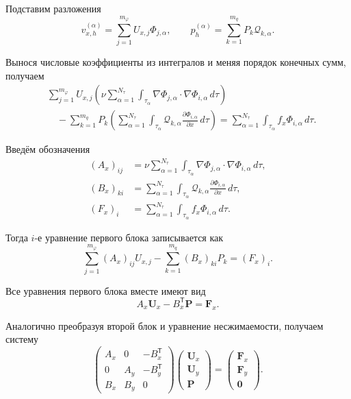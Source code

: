 \documentclass[a4paper,14pt]{extarticle}
\begin{document}
	Подставим разложения
	\[
	v_{x,h}^{(\alpha)}
	=
	\sum_{j=1}^{m_\varphi}
	U_{x,j}\Phi_{j,\alpha},
	\qquad
	p_h^{(\alpha)}
	=
	\sum_{k=1}^{m_q}
	P_k\mathcal Q_{k,\alpha}.
	\]
	
	Вынося числовые коэффициенты из интегралов и меняя порядок конечных
	сумм, получаем
	\[
	\begin{aligned}
		&
		\sum_{j=1}^{m_\varphi}
		U_{x,j}
		\left(
		\nu\sum_{\alpha=1}^{N_\tau}
		\int_{\tau_\alpha}
		\nabla\Phi_{j,\alpha}
		\cdot\nabla\Phi_{i,\alpha}\,d\tau
		\right)
		\\
		&\quad-
		\sum_{k=1}^{m_q}
		P_k
		\left(
		\sum_{\alpha=1}^{N_\tau}
		\int_{\tau_\alpha}
		\mathcal Q_{k,\alpha}
		\frac{\partial\Phi_{i,\alpha}}{\partial x}\,d\tau
		\right)
		=
		\sum_{\alpha=1}^{N_\tau}
		\int_{\tau_\alpha}
		f_x\Phi_{i,\alpha}\,d\tau.
	\end{aligned}
	\]
	
	Введём обозначения
	\[
	\begin{aligned}
		(A_x)_{ij}
		&=
		\nu\sum_{\alpha=1}^{N_\tau}
		\int_{\tau_\alpha}
		\nabla\Phi_{j,\alpha}
		\cdot\nabla\Phi_{i,\alpha}\,d\tau,
		\\
		(B_x)_{ki}
		&=
		\sum_{\alpha=1}^{N_\tau}
		\int_{\tau_\alpha}
		\mathcal Q_{k,\alpha}
		\frac{\partial\Phi_{i,\alpha}}{\partial x}\,d\tau,
		\\
		(F_x)_i
		&=
		\sum_{\alpha=1}^{N_\tau}
		\int_{\tau_\alpha}
		f_x\Phi_{i,\alpha}\,d\tau.
	\end{aligned}
	\]
	
	Тогда $i$-е уравнение первого блока записывается как
	\[
	\sum_{j=1}^{m_\varphi}
	(A_x)_{ij}U_{x,j}
	-
	\sum_{k=1}^{m_q}
	(B_x)_{ki}P_k
	=
	(F_x)_i.
	\]
	
	Все уравнения первого блока вместе имеют вид
	\[
	A_x\boldsymbol U_x
	-
	B_x^{\mathsf T}\boldsymbol P
	=
	\boldsymbol F_x.
	\]
	
	Аналогично преобразуя второй блок и уравнение несжимаемости,
	получаем систему
	\[
	\boxed{
		\begin{pmatrix}
			A_x&0&-B_x^{\mathsf T}\\
			0&A_y&-B_y^{\mathsf T}\\
			B_x&B_y&0
		\end{pmatrix}
		\begin{pmatrix}
			\boldsymbol U_x\\
			\boldsymbol U_y\\
			\boldsymbol P
		\end{pmatrix}
		=
		\begin{pmatrix}
			\boldsymbol F_x\\
			\boldsymbol F_y\\
			\boldsymbol 0
		\end{pmatrix}.
	}
	\]
	
\end{document}
